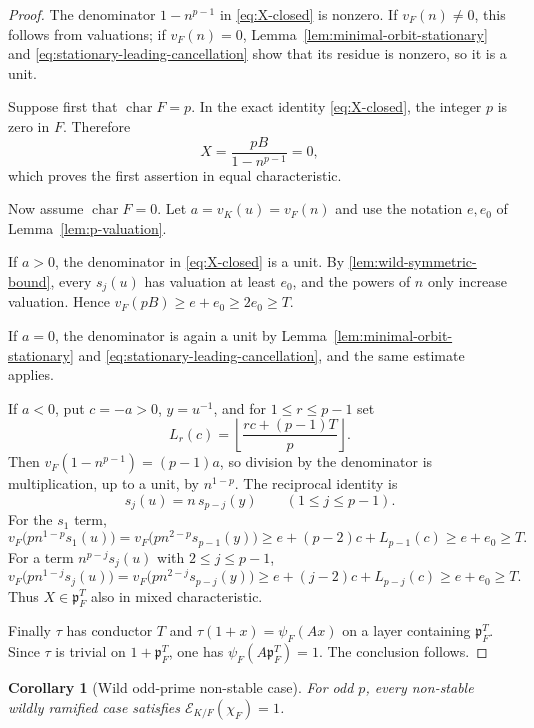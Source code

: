 \documentclass[11pt]{amsart}
\newtheorem{corollary}[theorem]{Corollary}
\theoremstyle{definition}
\theoremstyle{remark}
\newcommand{\p}{\mathfrak p}
\newcommand{\Err}{\mathcal E}
\newcommand{\floor}[1]{\left\lfloor #1\right\rfloor}
\begin{document}
\begin{proof}
The denominator $1-n^{p-1}$ in \eqref{eq:X-closed} is nonzero.  If
$v_F(n)\ne0$, this follows from valuations; if $v_F(n)=0$, Lemma~\ref{lem:minimal-orbit-stationary} and
\eqref{eq:stationary-leading-cancellation} show that its residue is
nonzero, so it is a unit.

Suppose first that $\operatorname{char}F=p$.  In the exact identity
\eqref{eq:X-closed}, the integer $p$ is zero in $F$.  Therefore
\[
 X=\frac{pB}{1-n^{p-1}}=0,
\]
which proves the first assertion in equal characteristic.

Now assume $\operatorname{char}F=0$.  Let
$a=v_K(u)=v_F(n)$ and use the notation $e,e_0$ of
Lemma~\ref{lem:p-valuation}.

If $a>0$, the denominator in \eqref{eq:X-closed} is a unit.  By
\cref{lem:wild-symmetric-bound}, every $s_j(u)$ has valuation at least
$e_0$, and the powers of $n$ only increase valuation.  Hence
$v_F(pB)\ge e+e_0\ge2e_0\ge T$.

If $a=0$, the denominator is again a unit by
Lemma~\ref{lem:minimal-orbit-stationary} and
\eqref{eq:stationary-leading-cancellation}, and the same estimate
applies.

If $a<0$, put $c=-a>0$, $y=u^{-1}$, and for
$1\le r\le p-1$ set
\begin{equation}\label{eq:Lrc}
 L_r(c)=\floor{\frac{rc+(p-1)T}{p}}.
\end{equation}
Then $v_F(1-n^{p-1})=(p-1)a$, so division by the denominator is
multiplication, up to a unit, by $n^{1-p}$.  The reciprocal
identity is
\begin{equation}\label{eq:reciprocal-symmetric}
 s_j(u)=n\,s_{p-j}(y)\qquad(1\le j\le p-1).
\end{equation}
For the $s_1$ term,
\[
 v_F\bigl(pn^{1-p}s_1(u)\bigr)
 =v_F\bigl(pn^{2-p}s_{p-1}(y)\bigr)
 \ge e+(p-2)c+L_{p-1}(c)
 \ge e+e_0\ge T.
\]
For a term $n^{p-j}s_j(u)$ with $2\le j\le p-1$,
\[
 v_F\bigl(pn^{1-j}s_j(u)\bigr)
 =v_F\bigl(pn^{2-j}s_{p-j}(y)\bigr)
 \ge e+(j-2)c+L_{p-j}(c)
 \ge e+e_0\ge T.
\]
Thus $X\in\p_F^T$ also in mixed characteristic.

Finally $\tau$ has conductor $T$ and
$\tau(1+x)=\psi_F(Ax)$ on a layer containing $\p_F^T$.  Since
$\tau$ is trivial on $1+\p_F^T$, one has
$\psi_F(A\p_F^T)=1$.  The conclusion follows.
\end{proof}

\begin{corollary}[Wild odd-prime non-stable case]
\label{cor:wild-odd}
For odd $p$, every non-stable wildly ramified case satisfies
$\Err_{K/F}(\chi_F)=1$.
\end{corollary}
\end{document}
